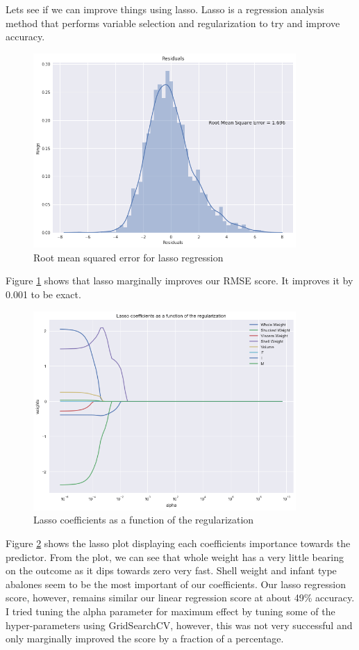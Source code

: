 Lets see if we can improve things using lasso. Lasso is a regression analysis method that performs variable selection and regularization to try and improve accuracy.
\begin{figure}[H]
  \centering
  \includegraphics[scale=0.5,width=100mm]{./images/abalone-lasso-regression.png}
  \caption{Root mean squared error for lasso regression}
  \label{fig:abalone-lasso-regression}
\end{figure}
Figure \ref{fig:abalone-lasso-regression} shows that lasso marginally improves our RMSE score. It improves it by 0.001 to be exact. 
\begin{figure}[H]
  \centering
  \includegraphics[scale=0.5,width=100mm]{./images/abalone-lasso-plot.png}
  \caption{Lasso coefficients as a function of the regularization}
  \label{fig:abalone-lasso-plot}
\end{figure}
Figure \ref{fig:abalone-lasso-plot} shows the lasso plot displaying each coefficients importance towards the predictor. From the plot, we can see that whole weight has a very little bearing on the outcome as it dips towards zero very fast. Shell weight and infant type abalones seem to be the most important of our coefficients. Our lasso regression score, however, remains similar our linear regression score at about 49\% accuracy. I tried tuning the alpha parameter for maximum effect by tuning some of the hyper-parameters using GridSearchCV, however, this was not very successful and only marginally improved the score by a fraction of a percentage.

